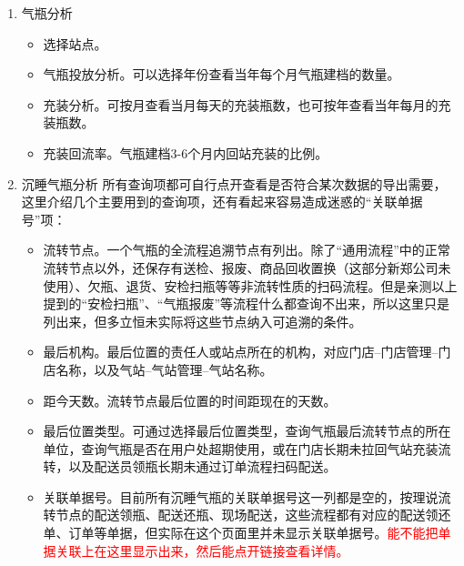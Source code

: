 \documentclass[UTF8]{ctexart}
\begin{document}
\begin{enumerate}
	\item 气瓶分析
	
	\begin{itemize}
		
		\item 选择站点。
		
		\item 气瓶投放分析。可以选择年份查看当年每个月气瓶建档的数量。
		
		\item 充装分析。可按月查看当月每天的充装瓶数，也可按年查看当年每月的充装瓶数。
		
		\item 充装回流率。气瓶建档3-6个月内回站充装的比例。
		
	\end{itemize}

	\item 沉睡气瓶分析
	所有查询项都可自行点开查看是否符合某次数据的导出需要，这里介绍几个主要用到的查询项，还有看起来容易造成迷惑的“关联单据号”项：
	\begin{itemize}
		
		\item 流转节点。一个气瓶的全流程追溯节点有列出。除了“通用流程”中的正常流转节点以外，还保存有送检、报废、商品回收置换（这部分新郑公司未使用）、欠瓶、退货、安检扫瓶等等非流转性质的扫码流程。但是亲测以上提到的“安检扫瓶”、“气瓶报废”等流程什么都查询不出来，所以这里只是列出来，但多立恒未实际将这些节点纳入可追溯的条件。
				
		\item 最后机构。最后位置的责任人或站点所在的机构，对应门店--门店管理--门店名称，以及气站--气站管理--气站名称。
		
		\item 距今天数。流转节点最后位置的时间距现在的天数。
		
		\item 最后位置类型。可通过选择最后位置类型，查询气瓶最后流转节点的所在单位，查询气瓶是否在用户处超期使用，或在门店长期未拉回气站充装流转，以及配送员领瓶长期未通过订单流程扫码配送。
		
		\item 关联单据号。目前所有沉睡气瓶的关联单据号这一列都是空的，按理说流转节点的配送领瓶、配送还瓶、现场配送，这些流程都有对应的配送领还单、订单等单据，但实际在这个页面里并未显示关联单据号。\textcolor{red}{能不能把单据关联上在这里显示出来，然后能点开链接查看详情。}
		
	\end{itemize}
	

\end{enumerate}
\end{document}
